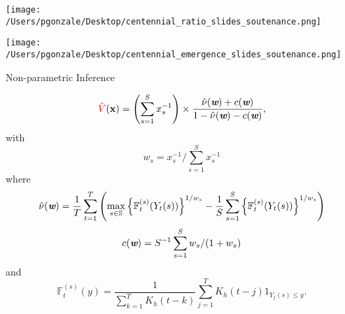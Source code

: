 \documentclass[9pt,compress]{beamer}
\begin{document}
%
%
%
\begin{frame}%
\begin{center}
\texttt{[image: /Users/pgonzale/Desktop/centennial\_ratio\_slides\_soutenance.png]}
 \end{center}    
 \end{frame}
%
%
%
\begin{frame}%
\begin{center}
\texttt{[image: /Users/pgonzale/Desktop/centennial\_emergence\_slides\_soutenance.png]}
 \end{center}    
 \end{frame}
%
%
%
\begin{frame}{Non-parametric Inference}  
\begin{tcolorbox}[title= A  madogram based approach (Marcon et al. 2017)  ]
\begin{equation*}
			 {\color{red} \hat V}({\bf x}) =  \left(\sum_{s=1}^S x^{-1}_s\right)  \times  \frac{\hat{\nu}(\textit{\textbf{w}}) + c(\textit{\textbf{w}})}{1 - \hat{\nu}(\textit{\textbf{w}}) - c(\textit{\textbf{w}})}, 
		\end{equation*}
		with
		$$
		w_s=x_s^{-1}/\sum_{s=1}^S x^{-1}_s
		$$
		where
		$$
		\hat{\nu}(\textit{\textbf{w}}) = \frac{1}{T}\sum_{t=1}^{T}\left(\max_{s\in\mathbb{S}} \left\{\mathbb{F}_{t}^{(s)}(Y_{t}(s))\right\}^{1/w_s} - \frac{1}{S}\sum_{s=1}^{S} \left\{\mathbb{F}_{t}^{(s)}(Y_{t}(s))\right\}^{1/w_s} \right)
		$$
		$$
		c(\textit{\textbf{w}})=S^{-1}\sum_{s=1}^{S}w_s/(1+w_s)
		$$
		and
		$$
		   \mathbb{F}_{t}^{(s)}(y) =\frac{1}{\sum_{k=1}^T K_{h}(t-k)}\sum_{j=1}^{T} K_{h}(t-j)1_{Y_j(s)\leq y}.
		$$

\end{tcolorbox}
\end{frame}
%
%
%
\end{document}
